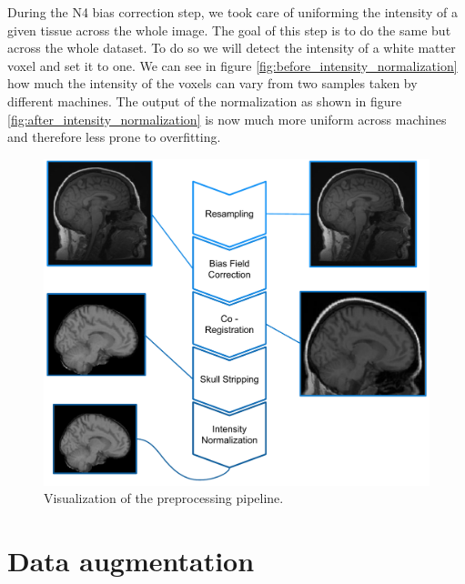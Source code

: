During the N4 bias correction step, we took care of uniforming the intensity of a given tissue across the whole image. The goal of this step is to do the same but across the whole dataset. To do so we will detect the intensity of a white matter voxel and set it to one. We can see in figure \ref{fig:before_intensity_normalization} how much the intensity of the voxels can vary from two samples taken by different machines. The output of the normalization as shown in figure \ref{fig:after_intensity_normalization} is now much more uniform across machines and therefore less prone to overfitting.

\begin{figure}
    \centering
    \includegraphics[width=1.0\textwidth]{figures/preprocessing/pipeline.pdf}
    \caption{Visualization of the preprocessing pipeline.}
    \label{fig:pipeline}
\end{figure}


\section{Data augmentation}


